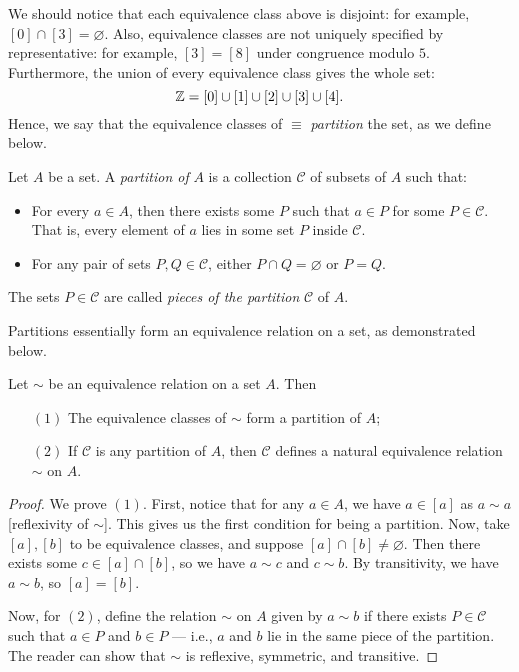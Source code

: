 \documentclass{article}
\begin{document}
We should notice that each equivalence class above is disjoint: for example, $[0] \cap [3] =\varnothing$. Also, equivalence classes are not uniquely specified by representative: for example, $[3] = [8]$ under congruence modulo $5$. Furthermore, the union of every equivalence class gives the whole set:
$$\mathbb Z = [0] \cup [1] \cup [2]\cup [3]\cup [4].$$
Hence, we say that the equivalence classes of $\equiv$ \textit{partition} the set, as we define below.

\begin{definition}
Let $A$ be a set. A \textit{partition of} $A$ is a collection $\mathcal C$ of subsets of $A$ such that:
\begin{itemize}
    \item For every $a\in A$, then there exists some $P$ such that $a\in P$ for some $P\in \mathcal C$. That is, every element of $a$ lies in some set $P$ inside $\mathcal C$.
    \item For any pair of sets $P, Q\in \mathcal C$, either $P\cap Q = \varnothing$ or $P = Q$.
\end{itemize}
The sets $P\in\mathcal C$ are called \textit{pieces of the partition} $\mathcal C$ of $A$.
\end{definition}

Partitions essentially form an equivalence relation on a set, as demonstrated below.
\begin{theorem}
Let $\sim$ be an equivalence relation on a set $A$. Then
\begin{enumerate}
    \item[$(1)$] The equivalence classes of $\sim$ form a partition of $A$;
    \item[$(2)$] If $\mathcal C$ is any partition of $A$, then $\mathcal C$ defines a natural equivalence relation $\sim$ on $A$.
\end{enumerate}
\end{theorem}
\begin{proof}
We prove $(1)$. First, notice that for any $a\in A$, we have $a\in [a]$ as $a\sim a$ [reflexivity of $\sim$]. This gives us the first condition for being a partition. Now, take $[a], [b]$ to be equivalence classes, and suppose $[a] \cap [b]\neq \varnothing$. Then there exists some $c\in [a]\cap [b]$, so we have $a\sim c$ and $c\sim b$. By transitivity, we have $a\sim b$, so $[a] = [b]$.

Now, for $(2)$, define the relation $\sim$ on $A$ given by $a\sim b$ if there exists $P\in\mathcal C$ such that $a\in P$ and $b\in P$ --- i.e., $a$ and $b$ lie in the same piece of the partition. The reader can show that $\sim$ is reflexive, symmetric, and transitive.
\end{proof}
\end{document}
